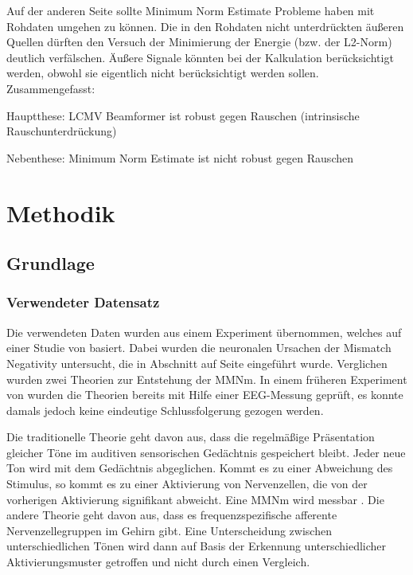 \documentclass[doc,a4paper,12pt]{apa6}
\makeatletter
\DeclareRobustCommand*{\nameref}[1]{%
      \glqq{\myorg@nameref{#1}}\grqq%
    }%
\makeatother
\begin{document}
Auf der anderen Seite sollte Minimum Norm Estimate Probleme haben mit Rohdaten umgehen zu können. Die in den Rohdaten nicht unterdrückten äußeren Quellen dürften den Versuch der Minimierung der Energie (bzw. der L2-Norm) deutlich verfälschen. Äußere Signale könnten bei der Kalkulation berücksichtigt werden, obwohl sie eigentlich nicht berücksichtigt werden sollen. Zusammengefasst:

\begin{compactitem}
\item Hauptthese: LCMV Beamformer ist robust gegen Rauschen (intrinsische Rauschunterdrückung)
\item Nebenthese: Minimum Norm Estimate ist nicht robust gegen Rauschen
\end{compactitem}


\newpage

\section{Methodik}
\label{sec:methodik}

\subsection{Grundlage}

\subsubsection{Verwendeter Datensatz}

Die verwendeten Daten wurden aus einem Experiment übernommen, welches auf einer Studie von \textcite{maess2007localizing} basiert. Dabei wurden die neuronalen Ursachen der Mismatch Negativity untersucht, die in Abschnitt \nameref{sec:erf} auf Seite \pageref{sec:erf} eingeführt wurde. Verglichen wurden zwei Theorien zur Entstehung der MMNm. In einem früheren Experiment von \textcite{jacobsen2001there} wurden die Theorien bereits mit Hilfe einer EEG-Messung geprüft, es konnte damals jedoch keine eindeutige Schlussfolgerung gezogen werden.

Die traditionelle Theorie geht davon aus, dass die regelmäßige Präsentation gleicher Töne im auditiven sensorischen Gedächtnis gespeichert bleibt. Jeder neue Ton wird mit dem Gedächtnis abgeglichen. Kommt es zu einer Abweichung des Stimulus, so kommt es zu einer Aktivierung von Nervenzellen, die von der vorherigen Aktivierung signifikant abweicht. Eine MMNm wird messbar \parencite{naatanen2001primitive}. Die andere Theorie geht davon aus, dass es frequenzspezifische afferente Nervenzellegruppen im Gehirn gibt. Eine Unterscheidung zwischen unterschiedlichen Tönen wird dann auf Basis der Erkennung unterschiedlicher Aktivierungsmuster getroffen und nicht durch einen Vergleich.
\end{document}
